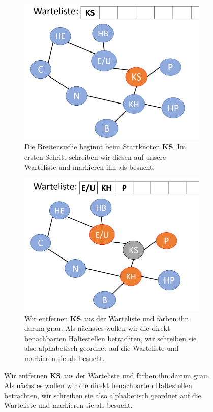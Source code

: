 \begin{figure}[H]
    \centering
    \begin{subfigure}[h]{0.45\textwidth}
    \includegraphics[width=\textwidth]{Pictures/BS/BFSB1.PNG}
    \caption{Die Breitensuche beginnt beim Startknoten {\bf{KS}}. Im ersten Schritt schreiben wir diesen auf unsere Warteliste und markieren ihn als besucht.}
    \label{fig:BS1}
    \end{subfigure}
    \vspace{5mm}
    \qquad
    \begin{subfigure}[h]{0.45\textwidth}
    \raggedleft
    \includegraphics[width=\textwidth]{Pictures/BS/BFSB.PNG}
    \caption{Wir entfernen {\bf{KS}} aus der Warteliste und färben ihn darum grau. Als nächstes wollen wir die direkt benachbarten Haltestellen betrachten, wir schreiben sie also alphabetisch geordnet auf die Warteliste und markieren sie als besucht.}

\end{subfigure}
\end{figure}
